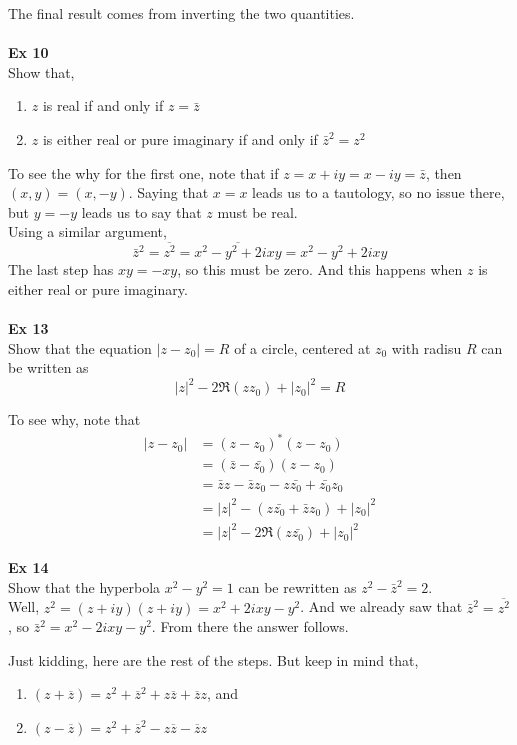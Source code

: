 The final result comes from inverting the two quantities.
\\~\\


\textbf{Ex 10}
\\
Show that,
\begin{enumerate}
    \item $z$ is real if and only if $z = \bar{z}$
    \item $z$ is either real or pure imaginary if and only if $\bar{z}^2 = z^2$
\end{enumerate}

To see the why for the first one, note that if $z = x + iy = x - iy = \bar{z}$,
then $(x, y) = (x, -y)$.
Saying that $x = x$ leads us to a tautology, so no issue there, but $y = -y$ leads us to say
that $z$ must be real.
\\

Using a similar argument,
$$
\bar{z}^2 = \overline{z^2} = \overline{x^2 - y^2 + 2ixy} = x^2 - y^2 + 2ixy
$$
The last step has $xy = -xy$, so this must be zero.
And this happens when $z$ is either real or pure imaginary.
\\~\\


\textbf{Ex 13}
\\
Show that the equation $|z - z_0| = R$ of a circle, centered at $z_0$ with radisu $R$
can be written as
$$
|z|^2 - 2\Re(zz_0) + |z_0|^2 = R
$$

To see why, note that
\begin{align*}
|z - z_0| &= (z - z_0)^* (z - z_0) \\
    &= (\bar{z} - \bar{z_0}) (z - z_0) \\
    &= \bar{z}z - \bar{z}z_0 - z\bar{z_0} + \bar{z_0}z_0 \\
    &= |z|^2 - (z\bar{z_0} + \bar{z}z_0) + |z_0|^2 \\
    &= |z|^2 - 2\Re(z\bar{z_0}) + |z_0|^2
\end{align*}


\textbf{Ex 14}
\\
Show that the hyperbola $x^2 - y^2 = 1$ can be rewritten as $z^2 - \bar{z}^2 = 2$.
\\

Well, $z^2 = (z + iy)(z + iy) = x^2 + 2ixy - y^2$.
And we already saw that $\bar{z}^2 = \overline{z^2}$, so $\bar{z}^2 = x^2 - 2ixy - y^2$.
From there the answer follows.

Just kidding, here are the rest of the steps.
But keep in mind that,
\begin{enumerate}
    \item $\left( z + \overline{z} \right) = z^2 + \overline{z}^2 + z\overline{z} + \overline{z}z$, and
    \item $\left( z - \overline{z} \right) = z^2 + \overline{z}^2 - z\overline{z} - \overline{z}z$
\end{enumerate}

